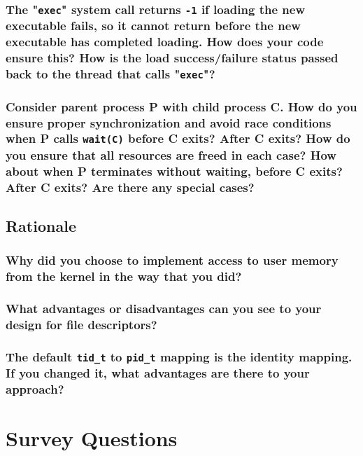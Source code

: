 \documentclass[sigconf, nonacm, balance=false, urlbreakonhyphens=true]{acmart}
\begin{document}
            \subsubsection{The "\texttt{exec}" system call returns \texttt{-1} if loading the new executable fails, so it cannot return before the new executable has completed loading.  How does your code ensure this?  How is the load success/failure status passed back to the thread that calls "\texttt{exec}"? }

            \subsubsection{Consider parent process P with child process C.  How do you ensure proper synchronization and avoid race conditions when P calls \texttt{wait(C)} before C exits?  After C exits?  How do you ensure that all resources are freed in each case?  How about when P terminates without waiting, before C exits?  After C exits?  Are there any special cases? }

        \subsection{Rationale}

            \subsubsection{Why did you choose to implement access to user memory from the kernel in the way that you did? }

            \subsubsection{What advantages or disadvantages can you see to your design for file descriptors? }

            \subsubsection{The default \texttt{tid\_t} to \texttt{pid\_t} mapping is the identity mapping.  If you changed it, what advantages are there to your approach? }
    
    \section{Survey Questions}

\end{document}
